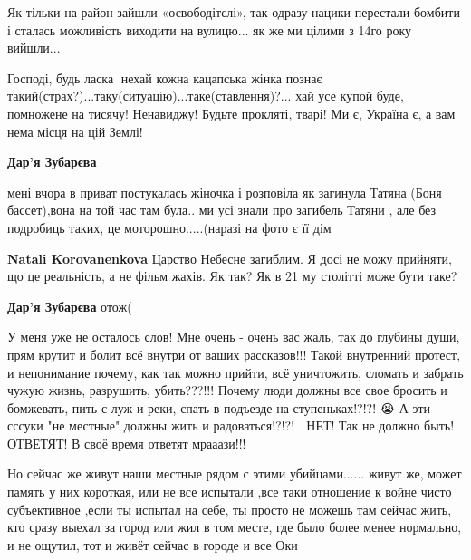  
 
 
 
 

\qqSecCmt


Як тільки на район зайшли «освободітєлі», так одразу нацики перестали бомбити і
сталась можливість виходити на вулицю... як же ми цілими з 14го року вийшли...

Господі, будь ласка🙏 нехай кожна кацапська жінка познає
такий(страх?)...таку(ситуацію)...таке(ставлення)?... хай усе купой буде, помножене на
тисячу! Ненавиджу! Будьте прокляті, тварі! Ми є, Україна є, а вам нема місця на
цій Землі!

\begin{itemize} %
\textbf{Дар'я Зубарєва} 

мені вчора в приват постукалась жіночка і розповіла як загинула Татяна (Боня
бассет),вона на той час там була.. ми усі знали про загибель Татяни , але без
подробиць таких, це моторошно.....(наразі на фото є її дім

\textbf{Natali Korovanenkova} Царство Небесне загиблим. Я досі не можу прийняти, що це реальність, а не фільм жахів. Як так? Як в 21 му столітті може бути таке?

\textbf{Дар'я Зубарєва} отож(

\end{itemize} %


У меня уже не осталось слов! Мне очень - очень вас жаль, так до глубины души,
прям крутит и болит всё внутри от ваших рассказов!!! Такой внутренний протест,
и непонимание почему, как так можно прийти, всё уничтожить, сломать и забрать
чужую жизнь, разрушить, убить???!!! Почему люди должны все свое бросить и
бомжевать, пить с луж и реки, спать в подъезде на ступеньках!?!?! 😭 А эти
сссуки "не местные" должны жить и радоваться!?!?! 🤬 НЕТ! Так не должно быть!
ОТВЕТЯТ! В своё время ответят мрааази!!!


Но сейчас же живут наши местные рядом с этими убийцами...... живут же, может
память у них короткая, или не все испытали ,все таки отношение к войне чисто
субъективное ,если ты испытал на себе, ты просто не можешь там сейчас жить, кто
сразу выехал за город или жил в том месте, где было более менее нормально, и не
ощутил, тот и живёт сейчас в городе и все Оки

